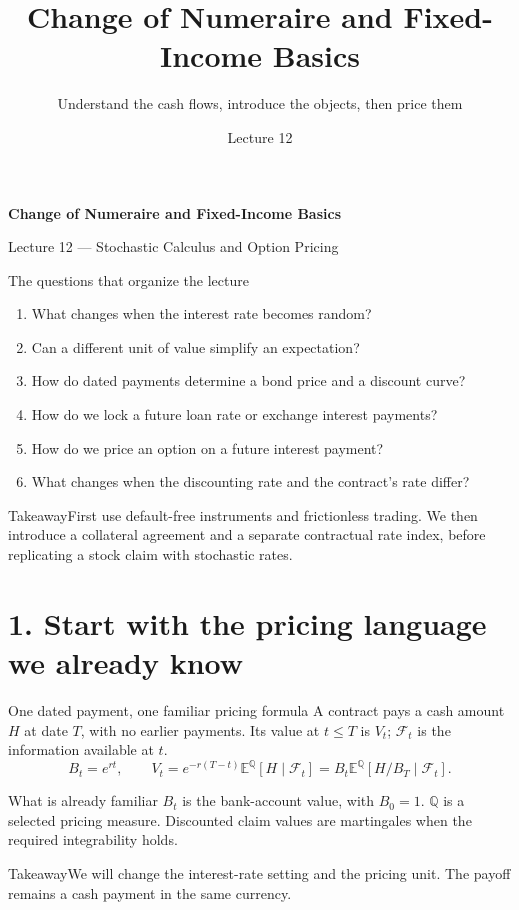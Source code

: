 \documentclass[handout,10pt,t,aspectratio=169]{beamer}
\title{Change of Numeraire and Fixed-Income Basics}
\subtitle{Understand the cash flows, introduce the objects, then price them}
\author{}\date{Lecture 12}
\newenvironment{keybox}{\begin{exampleblock}{Takeaway}}{\end{exampleblock}}
\newcommand{\E}{\mathbb E}
\newcommand{\Q}{\mathbb Q}
\newcommand{\F}{\mathcal F}
\begin{document}
\begin{frame}[plain]\vfill
{\LARGE\bfseries\color{CourseBlue}Change of Numeraire and Fixed-Income Basics\par}
\medskip{\color{CourseGold}\rule{.94\textwidth}{.8pt}}
\medskip Lecture 12 --- Stochastic Calculus and Option Pricing\vfill
\end{frame}

\begin{frame}{The questions that organize the lecture}
\begin{enumerate}
\item What changes when the interest rate becomes random?
\item Can a different unit of value simplify an expectation?
\item How do dated payments determine a bond price and a discount curve?
\item How do we lock a future loan rate or exchange interest payments?
\item How do we price an option on a future interest payment?
\item What changes when the discounting rate and the contract's rate differ?
\end{enumerate}
\begin{keybox}First use default-free instruments and frictionless trading.
We then introduce a collateral agreement and a separate contractual rate index,
before replicating a stock claim with stochastic rates.\end{keybox}
\end{frame}

\section{1. Start with the pricing language we already know}

\begin{frame}{One dated payment, one familiar pricing formula}
A contract pays a cash amount \(H\) at date \(T\), with no earlier payments.
Its value at \(t\leq T\) is \(V_t\); \(\F_t\) is the information available at \(t\).
\[
 B_t=e^{rt},\qquad
 V_t=e^{-r(T-t)}\E^\Q[H\mid\F_t]
     =B_t\E^\Q[H/B_T\mid\F_t].
\]
\begin{block}{What is already familiar}
\(B_t\) is the bank-account value, with \(B_0=1\).
\(\Q\) is a selected pricing measure. Discounted claim values are
martingales when the required integrability holds.
\end{block}
\begin{keybox}We will change the interest-rate setting and the pricing unit.
The payoff remains a cash payment in the same currency.\end{keybox}
\end{frame}
\end{document}

